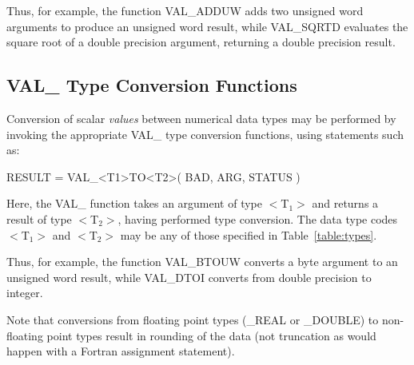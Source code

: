 \documentclass[11pt,nolof]{starlink}
\providecommand{\name}[1]{\mbox{#1}}
\begin{document}
Thus, for example, the function \name{VAL\_ADDUW} adds two unsigned word
arguments to produce an unsigned word result, while \name{VAL\_SQRTD}
evaluates the square root of a double precision argument, returning a double
precision result.

\subsection{\name{VAL\_} Type Conversion Functions}

Conversion of scalar \emph{values} between numerical data types may be
performed by invoking the appropriate \name{VAL\_} type conversion functions,
using statements such as:

\begin{terminalv}
RESULT = VAL_<T1>TO<T2>( BAD, ARG, STATUS )
\end{terminalv}

Here, the \name{VAL\_} function takes an argument of type \name{$<$T$_{1}>$}
and returns a result of type \name{$<$T$_{2}>$}, having performed type
conversion.
The data type codes \name{$<$T$_{1}>$} and \name{$<$T$_{2}>$} may be any of
those specified in Table~\ref{table:types}.

Thus, for example, the function \name{VAL\_BTOUW} converts a byte argument
to an unsigned word result, while \name{VAL\_DTOI} converts from double
precision to integer.

Note that conversions from floating point types (\name{\_REAL} or
\name{\_DOUBLE}) to non-floating point types result in rounding of the data
(not truncation as would happen with a Fortran assignment statement).
\end{document}

